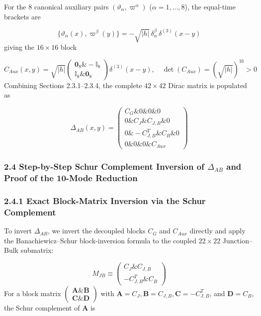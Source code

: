 \documentclass[aps,prd,onecolumn,superscriptaddress,nofootinbib,longbibliography,10pt]{revtex4-2}
\begin{document}
  For the 8 canonical auxiliary pairs \((\vartheta_\alpha, \varpi^\alpha)\) (\(\alpha = 1,\dots,8\)), the equal-time brackets are


  \[ \{\vartheta_\alpha(x), \varpi^\beta(y)\} = -\sqrt{|h|}\,\delta_\alpha^\beta\,\delta^{(3)}(x-y) \]
  giving the \(16 \times 16\) block


  \[ C_{Aux}(x,y) = \sqrt{|h|}\begin{pmatrix} \mathbf{0}_8 \& -\mathbb{I}_8 \\ \mathbb{I}_8 \& \mathbf{0}_8 \end{pmatrix}\delta^{(3)}(x-y), \quad \det(C_{Aux}) = \left(\sqrt{|h|}\right)^{16} > 0 \]
  Combining Sections 2.3.1–2.3.4, the complete \(42 \times 42\) Dirac matrix is populated as


  \[ \Delta_{AB}(x,y) = \begin{pmatrix} C_G \& 0 \& 0 \& 0 \\ 0 \& C_J \& C_{J,B} \& 0 \\ 0 \& -C_{J,B}^T \& C_B \& 0 \\ 0 \& 0 \& 0 \& C_{Aux} \end{pmatrix} \]
  
  
\subsubsection*{2.4 Step-by-Step Schur Complement Inversion of \(\Delta_{AB}\) and Proof of the 10-Mode Reduction}

  
\subsubsection*{2.4.1 Exact Block-Matrix Inversion via the Schur Complement}

  To invert \(\Delta_{AB}\), we invert the decoupled blocks \(C_G\) and \(C_{Aux}\) directly and apply the Banachiewicz–Schur block-inversion formula to the coupled \(22 \times 22\) Junction–Bulk submatrix:


  \[ M_{JB} \equiv \begin{pmatrix} C_J \& C_{J,B} \\ -C_{J,B}^T \& C_B \end{pmatrix} \]
  For a block matrix \(\begin{pmatrix} \mathbf{A} \& \mathbf{B} \\ \mathbf{C} \& \mathbf{D} \end{pmatrix}\) with \(\mathbf{A} = C_J, \mathbf{B} = C_{J,B}, \mathbf{C} = -C_{J,B}^T\), and \(\mathbf{D} = C_B\), the Schur complement of \(\mathbf{A}\) is
\end{document}
